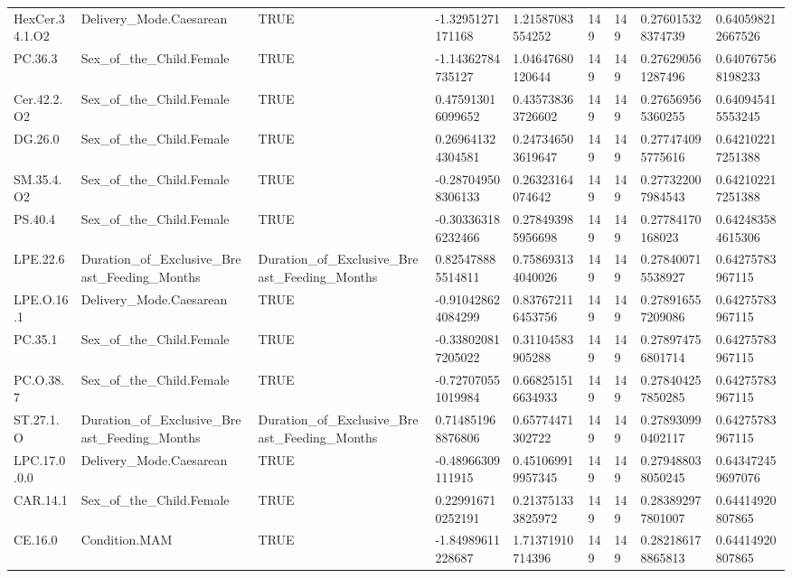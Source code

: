 \begin{longtable}{lllllllll}
HexCer.34.1.O2 & Delivery\_Mode.Caesarean & TRUE & -1.32951271171168 & 1.21587083554252 & 149 & 149 & 0.276015328374739 & 0.640598212667526 \\
PC.36.3 & Sex\_of\_the\_Child.Female & TRUE & -1.14362784735127 & 1.04647680120644 & 149 & 149 & 0.276290561287496 & 0.640767568198233 \\
Cer.42.2.O2 & Sex\_of\_the\_Child.Female & TRUE & 0.475913016099652 & 0.435738363726602 & 149 & 149 & 0.276569565360255 & 0.640945415553245 \\
DG.26.0 & Sex\_of\_the\_Child.Female & TRUE & 0.269641324304581 & 0.247346503619647 & 149 & 149 & 0.277474095775616 & 0.642102217251388 \\
SM.35.4.O2 & Sex\_of\_the\_Child.Female & TRUE & -0.287049508306133 & 0.26323164074642 & 149 & 149 & 0.277322007984543 & 0.642102217251388 \\
PS.40.4 & Sex\_of\_the\_Child.Female & TRUE & -0.303363186232466 & 0.278493985956698 & 149 & 149 & 0.27784170168023 & 0.642483584615306 \\
LPE.22.6 & Duration\_of\_Exclusive\_Breast\_Feeding\_Months & Duration\_of\_Exclusive\_Breast\_Feeding\_Months & 0.825478885514811 & 0.758693134040026 & 149 & 149 & 0.278400715538927 & 0.64275783967115 \\
LPE.O.16.1 & Delivery\_Mode.Caesarean & TRUE & -0.910428624084299 & 0.837672116453756 & 149 & 149 & 0.278916557209086 & 0.64275783967115 \\
PC.35.1 & Sex\_of\_the\_Child.Female & TRUE & -0.338020817205022 & 0.31104583905288 & 149 & 149 & 0.278974756801714 & 0.64275783967115 \\
PC.O.38.7 & Sex\_of\_the\_Child.Female & TRUE & -0.727070551019984 & 0.668251516634933 & 149 & 149 & 0.278404257850285 & 0.64275783967115 \\
ST.27.1.O & Duration\_of\_Exclusive\_Breast\_Feeding\_Months & Duration\_of\_Exclusive\_Breast\_Feeding\_Months & 0.714851968876806 & 0.65774471302722 & 149 & 149 & 0.278930990402117 & 0.64275783967115 \\
LPC.17.0.0.0 & Delivery\_Mode.Caesarean & TRUE & -0.48966309111915 & 0.451069919957345 & 149 & 149 & 0.279488038050245 & 0.643472459697076 \\
CAR.14.1 & Sex\_of\_the\_Child.Female & TRUE & 0.229916710252191 & 0.213751333825972 & 149 & 149 & 0.283892977801007 & 0.64414920807865 \\
CE.16.0 & Condition.MAM & TRUE & -1.84989611228687 & 1.71371910714396 & 149 & 149 & 0.282186178865813 & 0.64414920807865 \\

\end{longtable}
